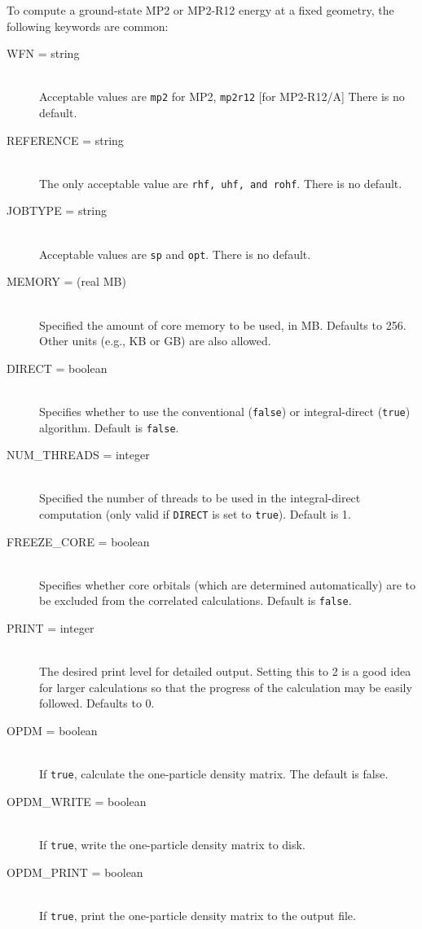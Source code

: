 To compute a ground-state MP2 or MP2-R12 energy at a fixed geometry,
the following keywords are common:
\begin{description}
\item[WFN = string]\mbox{}\\
Acceptable values are {\tt mp2} for MP2, {\tt mp2r12} [for MP2-R12/A]
There is no default.  
\item[REFERENCE = string]\mbox{}\\
The only acceptable value are {\tt rhf, uhf, and rohf}.
There is no default.
\item[JOBTYPE = string]\mbox{}\\
Acceptable values are {\tt sp} and {\tt opt}.  There is no default.
\item[MEMORY = (real MB)]\mbox{}\\
Specified the amount of core memory to be used, in MB.  Defaults to 256.
Other units (e.g., KB or GB) are also allowed.
\item[DIRECT = boolean]\mbox{}\\
Specifies whether to use the conventional ({\tt false}) or
integral-direct ({\tt true}) algorithm. Default is {\tt false}.
\item[NUM\_THREADS = integer]\mbox{}\\
Specified the number of threads to be used in the integral-direct
computation (only valid if {\tt DIRECT} is set to {\tt true}).
Default is 1.
\item[FREEZE\_CORE = boolean]\mbox{}\\
Specifies whether core orbitals (which are determined automatically) are to
be excluded from the correlated calculations.  Default is {\tt false}.
\item[PRINT = integer]\mbox{}\\
The desired print level for detailed output.  Setting this to 2 is a good
idea for larger calculations so that the progress of the calculation may be
easily followed.  Defaults to 0.
\item[OPDM = boolean]\mbox{}\\
If {\tt true}, calculate the one-particle density matrix.  The default is false.
\item[OPDM\_WRITE = boolean]\mbox{}\\
If {\tt true}, write the one-particle density matrix to disk.
\item[OPDM\_PRINT = boolean]\mbox{}\\
If {\tt true}, print the one-particle density matrix to the output file.
\end{description}

